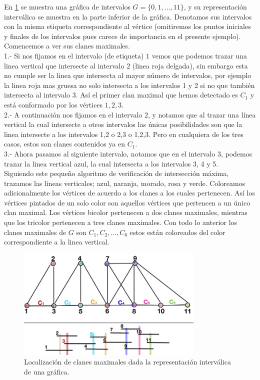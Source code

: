 En \cref{fig:208} se muestra una gráfica de intervalos $G=\{ 0,1, ..., 11\}$, y su representación interválica se muestra en la parte inferior de la gráfica. Denotamos sus intervalos con la misma etiqueta correspondiente al vértice (omitiremos los puntos iniciales y finales de los intervalos pues carece de importancia en el presente ejemplo).     
Comencemos a ver sus clanes maximales.\\
1.- Si nos fijamos en el intervalo (de etiqueta) $1$ vemos que podemos trazar una linea vertical que intersecte al intervalo 2 (linea roja delgada), sin embargo esta no cumple ser la linea que intersecta al mayor número de intervalos, por ejemplo la linea roja mas gruesa no solo intersecta a los intervalos 1 y 2 si no que también intersecta al intervalo 3. Así el primer clan maximal que hemos detectado es $C_1$ y está conformado por los vértices $1,2,3$.\\
2.- A continuación nos fijamos en el intervalo 2, y notamos que al trazar una línea vertical la cual intersecte a otros intervalos las únicas posibilidades son que la linea intersecte a los intervalos 1,2 o 2,3 o 1,2,3. Pero en cualquiera de los tres casos, estos son clanes contenidos ya en $C_1$.\\
3.- Ahora pasamos al siguiente intervalo, notamos que en el intervalo 3, podemos trazar la linea vertical azul, la cual intersecta a los intervalos 3, 4 y 5. \\
Siguiendo este pequeño algoritmo de verificación de intersección máxima, trazamos las lineas verticales; azul, naranja, morado, rosa y verde. Coloreamos adicionalmente los vértices de acuerdo a los clanes a los cuales pertenecen. Así los vértices pintados de un solo color son aquellos vértices que pertencen a un  único clan maximal. Los vértices bicolor pertenecen a dos clanes maximales, mientras que los tricolor pertenecen a tres clanes maximales. Con todo lo anterior los clanes maximales de $G$ son $C_1, C_2, ..., C_6$ estos están coloreados del color correspondiente a la linea vertical.    


\begin{figure}[H]
  \centering
  \includegraphics[width=0.8\textwidth]{recursos/capturas/208.jpg}
  \caption{Localización de clanes maximales dada la representación interválica de una gráfica.}
  \label{fig:208}
\end{figure}

